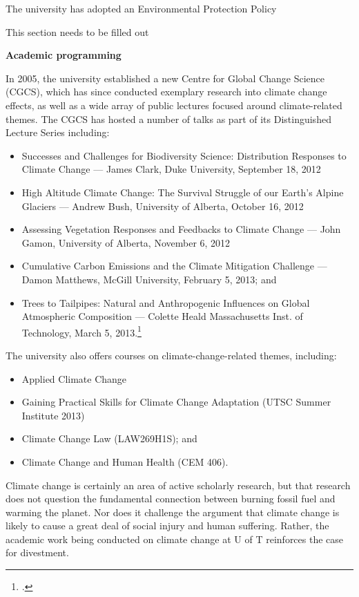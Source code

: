 The university has adopted an Environmental Protection Policy

\begin{vcom}
	This section needs to be filled out
\end{vcom}




\textbf{Academic programming}



In 2005, the university established a new Centre for Global Change Science (CGCS), which has since conducted exemplary research into climate change effects, as well as a wide array of public lectures focused around climate-related themes. The CGCS has hosted a number of talks as part of its Distinguished Lecture Series including:
\begin{itemize}
	\item Successes and Challenges for Biodiversity Science: Distribution Responses to Climate Change --- James Clark, Duke University, September 18, 2012
	\item High Altitude Climate Change: The Survival Struggle of our Earth’s Alpine Glaciers --- Andrew Bush, University of Alberta, October 16, 2012 
	\item Assessing Vegetation Responses and Feedbacks to Climate Change --- John Gamon, University of Alberta, November 6, 2012
	\item Cumulative Carbon Emissions and the Climate Mitigation Challenge --- Damon Matthews, McGill University, February 5, 2013; and
	\item Trees to Tailpipes: Natural and Anthropogenic Influences on Global Atmospheric Composition --- Colette Heald Massachusetts Inst. of Technology, March 5, 2013.\footcite[][]{DistinguishedLecturer}
\end{itemize}



The university also offers courses on climate-change-related themes, including:
\begin{itemize}
	\item Applied Climate Change
	\item Gaining Practical Skills for Climate Change Adaptation (UTSC Summer Institute 2013)
	\item Climate Change Law (LAW269H1S); and
	\item Climate Change and Human Health (CEM 406).
\end{itemize}



Climate change is certainly an area of active scholarly research, but that research does not question the fundamental connection between burning fossil fuel and warming the planet. 
Nor does it challenge the argument that climate change is likely to cause a great deal of social injury and human suffering.
Rather, the academic work being conducted on climate change at U of T reinforces the case for divestment.



